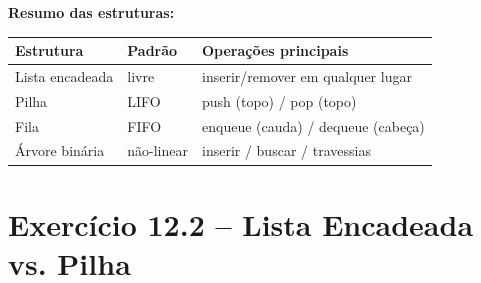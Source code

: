 \documentclass[12pt,a4paper]{article}
\begin{document}
\begin{respostabox}
\textbf{Resumo das estruturas:}
\begin{center}
\renewcommand{\arraystretch}{1.25}
\begin{tabular}{l l l}
\toprule
\textbf{Estrutura} & \textbf{Padrão} & \textbf{Operações principais} \\ \midrule
Lista encadeada & livre & inserir/remover em qualquer lugar \\
Pilha & LIFO & push (topo) / pop (topo) \\
Fila & FIFO & enqueue (cauda) / dequeue (cabeça) \\
Árvore binária & não-linear & inserir / buscar / travessias \\
\bottomrule
\end{tabular}
\end{center}
\end{respostabox}

\newpage

\section{Exercício 12.2 -- Lista Encadeada vs. Pilha}
\end{document}
